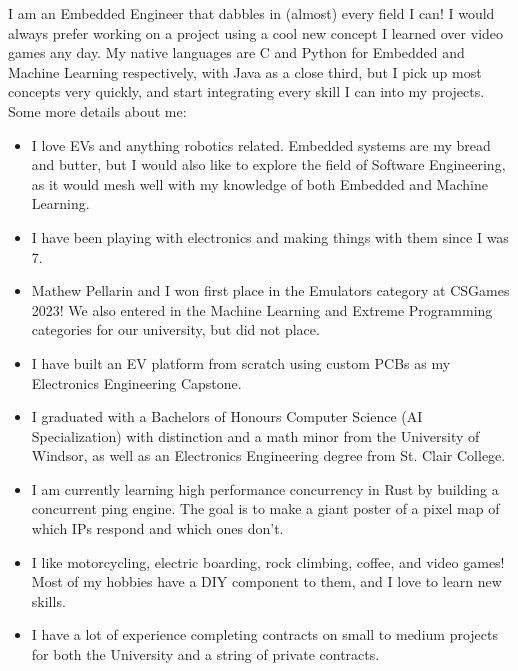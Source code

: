 I am an Embedded Engineer that dabbles in (almost) every field I can! I would always prefer working on a project using a cool new concept I learned over video games any day. My native languages are C and Python for Embedded and Machine Learning respectively, with Java as a close third, but I pick up most concepts very quickly, and start integrating every skill I can into my projects. Some more details about me:

\begin{itemize}
  \item I love EVs and anything robotics related. Embedded systems are my bread and butter, but I would also like to explore the field of Software Engineering, as it would mesh well with my knowledge of both Embedded and Machine Learning.
  \item I have been playing with electronics and making things with them since I was 7.
  \item Mathew Pellarin and I won first place in the Emulators category at CSGames 2023! We also entered in the Machine Learning and Extreme Programming categories for our university, but did not place.
  \item I have built an EV platform from scratch using custom PCBs as my Electronics Engineering Capstone.
  \item I graduated with a Bachelors of Honours Computer Science (AI Specialization) with distinction and a math minor from the University of Windsor, as well as an Electronics Engineering degree from St. Clair College.
  \item I am currently learning high performance concurrency in Rust by building a concurrent ping engine. The goal is to make a giant poster of a pixel map of which IPs respond and which ones don't.
  \item I like motorcycling, electric boarding, rock climbing, coffee, and video games! Most of my hobbies have a DIY component to them, and I love to learn new skills.
  \item I have a lot of experience completing contracts on small to medium projects for both the University and a string of private contracts.
\end{itemize}
